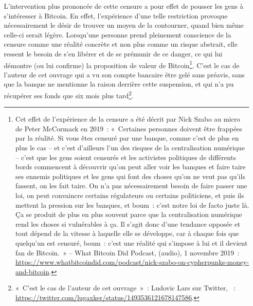 L'intervention plus prononcée de cette censure a pour effet de pousser les gens à s'intéresser à Bitcoin. En effet, l'expérience d'une telle restriction provoque nécessairement le désir de trouver un moyen de la contourner, quand bien même celle-ci serait légère. Lorsqu'une personne prend pleinement conscience de la censure comme une réalité concrète et non plus comme un risque abstrait, elle ressent le besoin de s'en libérer et de se prémunir de ce danger, ce qui lui démontre (ou lui confirme) la proposition de valeur de Bitcoin\footnote{Cet effet de l'expérience de la censure a été décrit par Nick Szabo au micro de Peter McCormack en 2019~: «~Certaines personnes doivent être frappées par la réalité. Si vous êtes censuré par une banque, comme c'est de plus en plus le cas -- et c'est d'ailleurs l'un des risques de la centralisation numérique -- c'est que les gens soient censurés et les activistes politiques de différents bords commencent à découvrir qu'on peut aller voir les banques et faire taire ses ennemis politiques et les gens qui font des choses qu'on ne veut pas qu'ils fassent, on les fait taire. On n'a pas nécessairement besoin de faire passer une loi, on peut convaincre certains régulateurs ou certains politiciens, et puis ils mettent la pression sur les banques, et boum~: c'est notre loi de facto juste là. Ça se produit de plus en plus souvent parce que la centralisation numérique rend les choses si vulnérables à ça. Il s'agit donc d'une tendance opposée et tout dépend de la vitesse à laquelle elle se développe, car à chaque fois que quelqu'un est censuré, boum~: c'est une réalité qui s'impose à lui et il devient fan de Bitcoin.~» -- What Bitcoin Did Podcast,  (audio), 1\ier{} novembre 2019~: \url{https://www.whatbitcoindid.com/podcast/nick-szabo-on-cypherpunks-money-and-bitcoin}.}. C'est le cas de l'auteur de cet ouvrage qui a vu son compte bancaire être gelé sans préavis, sans que la banque ne mentionne la raison derrière cette suspension, et qui n'a pu récupérer ses fonds que six mois plus tard\footnote{«~C'est le cas de l'auteur de cet ouvrage~»~: Ludovic Lars sur Twitter, ~: \url{https://twitter.com/lugaxker/status/1493536121678147586}.}.


